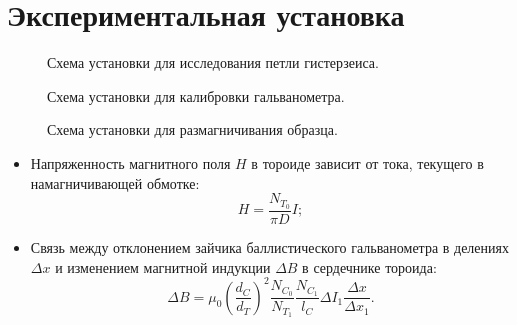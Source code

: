 \documentclass[a4paper,12pt]{article} %
\begin{document}
\section{Экспериментальная установка}
	\begin{figure}[H]
		\caption{Схема установки для исследования петли гистерзеиса.}
		\label{ris:ustanovka_1}
	\end{figure}
	\begin{figure}[H]
		\caption{Схема установки для калибровки гальванометра.}
		\label{ris:ustanovka_2}
	\end{figure}
	\begin{figure}[H]
		\caption{Схема установки для размагничивания образца.}
		\label{ris:ustanovka_3}
	\end{figure}

	\begin{itemize}
		\item
			Напряженность магнитного поля $H$ в тороиде зависит от тока, текущего в намагничивающей обмотке:
			\begin{equation}\label{eq:H}
				H = \frac{N_{T_0}}{\pi D} I;
			\end{equation}
		\item
			Связь между отклонением зайчика баллистического гальванометра в делениях $\Delta x$ и изменением магнитной индукции $\Delta B$ в сердечнике тороида:
			\begin{equation}\label{eq:B}
				\Delta B = \mu_0 \left(\frac{d_C}{d_T}\right)^2 \frac{N_{C_0}}{N_{T_1}} \frac{N_{C_1}}{l_C} \Delta I_1 \frac{\Delta x}{\Delta x_1}.
			\end{equation}
	\end{itemize}
	
\end{document}
